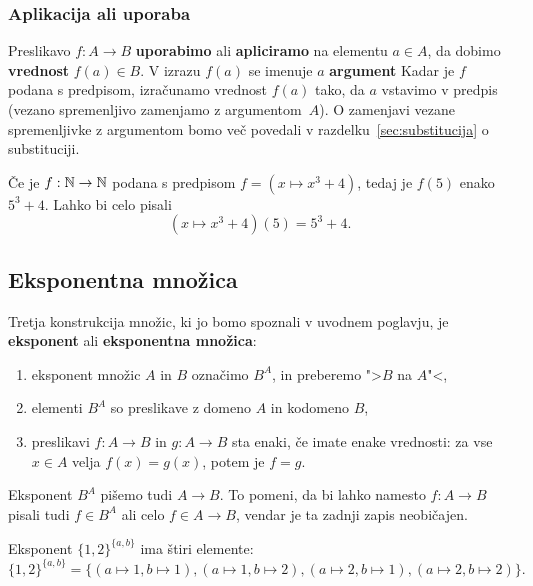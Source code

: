 \subsubsection{Aplikacija ali uporaba}

Preslikavo $f : A \to B$ \textbf{uporabimo} ali \textbf{apliciramo} na elementu $a \in A$, da dobimo \textbf{vrednost} $f(a) \in B$. V izrazu $f(a)$ se imenuje $a$ \textbf{argument}
%
Kadar je $f$ podana s predpisom, izračunamo vrednost $f(a)$ tako, da $a$ vstavimo v predpis (vezano spremenljivo zamenjamo z argumentom~$A$).
%
O zamenjavi vezane spremenljivke z argumentom bomo več povedali v razdelku~\ref{sec:substitucija} o substituciji.

\begin{primer}
  Če je $f : \mathbb{N} \to \mathbb{N}$ podana s predpisom $f = (x \mapsto x^3 + 4)$, tedaj je $f(5)$ enako $5^3 + 4$. Lahko bi celo pisali
  \begin{equation*}
    (x \mapsto x^3 + 4)(5) = 5^3 + 4.
  \end{equation*}
\end{primer}


\subsection{Eksponentna množica}

Tretja konstrukcija množic, ki jo bomo spoznali v uvodnem poglavju, je \textbf{eksponent} ali \textbf{eksponentna množica}:
%
\begin{enumerate}
\item eksponent množic $A$ in $B$ označimo $B^A$, in preberemo ">$B$ na $A$"<,
\item elementi $B^A$ so preslikave z domeno $A$ in kodomeno $B$,
\item preslikavi $f : A \to B$ in $g : A \to B$ sta enaki, če imate enake vrednosti: za
  vse $x \in A$ velja $f(x) = g(x)$, potem je $f = g$.
\end{enumerate}
%
Eksponent $B^A$ pišemo tudi $A \to B$. To pomeni, da bi lahko namesto $f : A \to B$ pisali tudi $f \in B^A$ ali celo $f \in A \to B$, vendar je ta zadnji zapis neobičajen.

\begin{primer}
Eksponent $\{1, 2\}^{\{a, b\}}$ ima štiri elemente:
%
\begin{equation*}
  \{1, 2\}^{\{a, b\}} =
  \{
     (a \mapsto 1, b \mapsto 1),
     (a \mapsto 1, b \mapsto 2),
     (a \mapsto 2, b \mapsto 1),
     (a \mapsto 2, b \mapsto 2)
  \}.
\end{equation*}
\end{primer}


